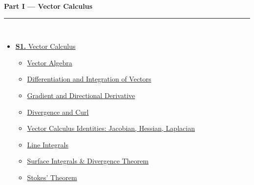 \documentclass[12pt,a3paper]{article}
\begin{document}
\begin{tcolorbox}[breakable,colback=cD!5,colframe=cD,boxrule=1pt,arc=5pt,
  left=8pt,right=8pt,top=8pt,bottom=8pt,before skip=4pt]
  {\large\bfseries\textcolor{cD}{Part I --- Vector Calculus}}\\[5pt]
  \textcolor{cD!40}{\rule{\textwidth}{0.4pt}}\\[3pt]
  \small\begin{itemize}[leftmargin=1.2em,itemsep=1pt,label={\textcolor{cD}{$\triangleright$}}]
    \item \hyperref[sec:S4]{\textbf{S1.} Vector Calculus}
      \begin{itemize}[leftmargin=1.5em,itemsep=0pt,label={\textcolor{cD}{$\cdot$}}]
        \item \hyperref[sub:s4-algebra]{Vector Algebra}
        \item \hyperref[sub:s4-diffint]{Differentiation and Integration of Vectors}
        \item \hyperref[sub:s4-gradient]{Gradient and Directional Derivative}
        \item \hyperref[sub:s4-divcurl]{Divergence and Curl}
        \item \hyperref[sub:s4-identities]{Vector Calculus Identities: Jacobian, Hessian, Laplacian}
        \item \hyperref[sub:s4-lineint]{Line Integrals}
        \item \hyperref[sub:s4-surface]{Surface Integrals \& Divergence Theorem}
        \item \hyperref[sub:s4-stokes]{Stokes' Theorem}
      \end{itemize}
  \end{itemize}
\end{tcolorbox}

\vspace{6pt}
\end{document}
